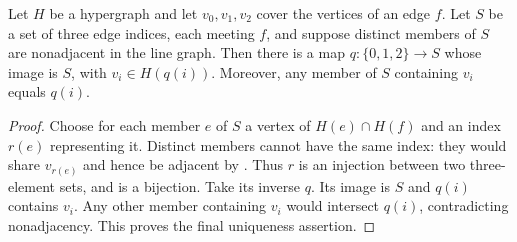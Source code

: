 \begin{lemma}
Let $H$ be a hypergraph and let $v_0,v_1,v_2$ cover the
vertices of an edge $f$. Let $S$ be a set of three edge indices, each
meeting $f$, and suppose distinct members of $S$ are nonadjacent in
the line graph. Then there is a map $q:\{0,1,2\}\to S$ whose image is
$S$, with $v_i\in H(q(i))$. Moreover, any member of $S$ containing
$v_i$ equals $q(i)$.
\end{lemma}
\begin{proof}
Choose for each member $e$ of $S$ a vertex of $H(e)\cap H(f)$ and an
index $r(e)$ representing it. Distinct members cannot have the same
index: they would share $v_{r(e)}$ and hence be adjacent by
. Thus $r$ is an injection between two
three-element sets, and is a bijection. Take its inverse $q$.
Its image is $S$ and $q(i)$ contains $v_i$. Any other member containing
$v_i$ would intersect $q(i)$, contradicting nonadjacency. This proves
the final uniqueness assertion.
\end{proof}
